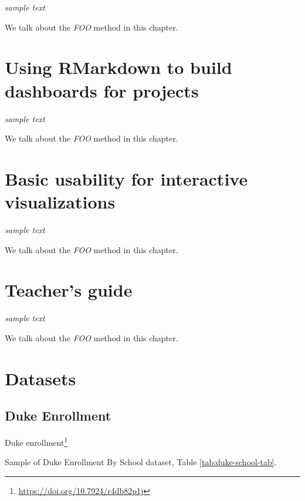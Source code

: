 \documentclass[
]{krantz}
\renewcommand{\href}[2]{#2\footnote{\url{#1}}}
\begin{document}
\emph{sample text}

We talk about the \emph{FOO} method in this chapter.

\hypertarget{rmarkdown-dashboards}{%
\chapter{Using RMarkdown to build dashboards for projects}\label{rmarkdown-dashboards}}

\emph{sample text}

We talk about the \emph{FOO} method in this chapter.

\hypertarget{usability-for-visualizations}{%
\chapter{Basic usability for interactive visualizations}\label{usability-for-visualizations}}

\emph{sample text}

We talk about the \emph{FOO} method in this chapter.

\hypertarget{teachers-guide}{%
\chapter{Teacher's guide}\label{teachers-guide}}

\emph{sample text}

We talk about the \emph{FOO} method in this chapter.

\cleardoublepage

\hypertarget{appendix-appendix}{%
\appendix {}}


\hypertarget{datasets}{%
\chapter{Datasets}\label{datasets}}

\hypertarget{duke-enrollment}{%
\section*{Duke Enrollment}\label{duke-enrollment}}


\href{https://doi.org/10.7924/r4db82p1j}{Duke enrollment}

Sample of Duke Enrollment By School dataset, Table \ref{tab:duke-school-tab}.
\end{document}
